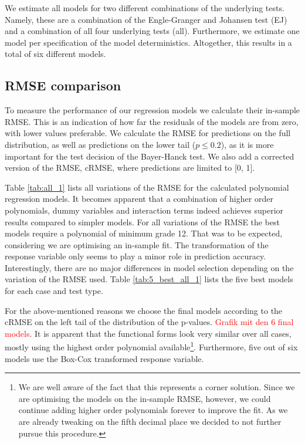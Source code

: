 \documentclass[12pt,a4paper]{article}
\let\rmarkdownfootnote\footnote%
\def\footnote{\protect\rmarkdownfootnote}
\begin{document}
We estimate all models for two different combinations of the underlying
tests. Namely, these are a combination of the Engle-Granger and Johansen
test (EJ) and a combination of all four underlying tests (all).
Furthermore, we estimate one model per specification of the model
deterministics. Altogether, this results in a total of six different
models.

\hypertarget{rmse-comparison}{%
\subsection{RMSE comparison}\label{rmse-comparison}}

To measure the performance of our regression models we calculate their
in-sample RMSE. This is an indication of how far the residuals of the
models are from zero, with lower values preferable. We calculate the
RMSE for predictions on the full distribution, as well as predictions on
the lower tail (\(p \leq 0.2\)), as it is more important for the test
decision of the Bayer-Hanck test. We also add a corrected version of the
RMSE, cRMSE, where predictions are limited to {[}0, 1{]}.

Table \ref{tab:all_1} lists all variations of the RMSE for the
calculated polynomial regression models. It becomes apparent that a
combination of higher order polynomials, dummy variables and interaction
terms indeed achieves superior results compared to simpler models. For
all variations of the RMSE the best models require a polynomial of
minimum grade 12. That was to be expected, considering we are optimising
an in-sample fit. The transformation of the response variable only seems
to play a minor role in prediction accuracy. Interestingly, there are no
major differences in model selection depending on the variation of the
RMSE used. Table \ref{tab:5_best_all_1} lists the five best models for
each case and test type.

For the above-mentioned reasons we choose the final models according to
the cRMSE on the left tail of the distribution of the p-values.
\textcolor{red}{Grafik mit den 6 final models}. It is apparent that the
functional forms look very similar over all cases, mostly using the
highest order polynomial available\footnote{We are well aware of the
  fact that this represents a corner solution. Since we are optimising
  the models on the in-sample RMSE, however, we could continue adding
  higher order polynomials forever to improve the fit. As we are already
  tweaking on the fifth decimal place we decided to not further pursue
  this procedure.}. Furthermore, five out of six models use the Box-Cox
transformed response variable.
\end{document}
